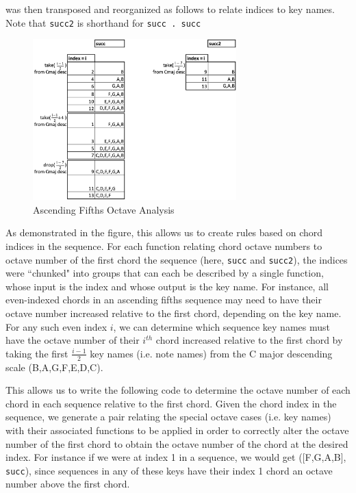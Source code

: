 \documentclass{report}
\begin{document}
  was then transposed and reorganized as follows to relate indices to key names. Note that \verb.succ2. is shorthand for \verb!succ . succ!

\begin{figure}[h!]
\centering
\includegraphics[width=0.7\textwidth]{images/asc_fifths_octave_analysis}
  \caption{Ascending Fifths Octave Analysis}
  \label{fig:asc_fifths_octave_analysis}
\end{figure}
\newpage

As demonstrated in the figure, this allows us to create rules based on chord indices in the sequence. For each function relating chord octave numbers to octave number of the first chord the sequence (here, \verb.succ. and \verb.succ2.), the indices were ``chunked" into groups that can each be described by a single function, whose input is the index and whose output is the key name. For instance, all even-indexed chords in an ascending fifths sequence may need to have their octave  number increased relative to the first chord, depending on the key name. For any such even index $i$, we can determine which sequence key names must have the octave number of their $i^{th}$ chord increased relative to the first chord by taking the first $\frac{i-1}{2}$ key names (i.e. note names) from the C major descending scale (B,A,G,F,E,D,C). 

This allows us to write the following code to determine the octave number of each chord in each sequence relative to the first chord. Given the chord index in the sequence, we generate a pair relating the special octave cases (i.e. key names) with their associated  functions to be applied in order to correctly alter the octave number of the first chord to obtain the octave number of the chord at the desired index. For instance if we were at index 1 in a sequence, we would get ([F,G,A,B], \verb.succ.), since sequences in any of these keys have their index 1 chord an octave number above the first chord.
\end{document}
